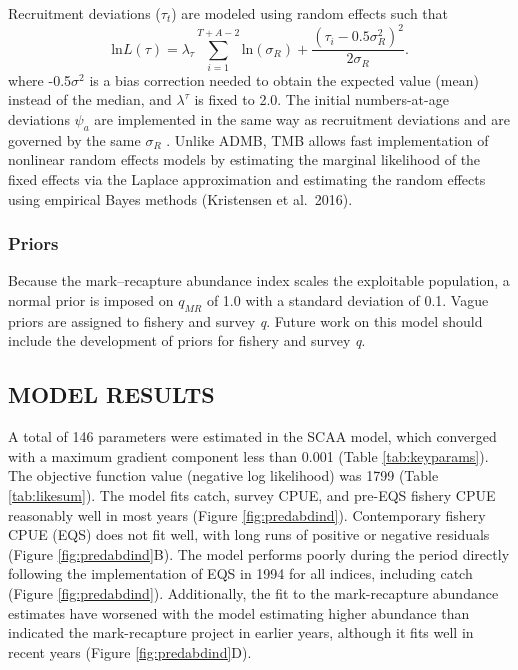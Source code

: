 \documentclass[
]{article}
\begin{document}
Recruitment deviations (\(\tau_t\)) are modeled using random effects such that
\[
\begin{equation}
\mbox{ln}L(\tau)=\lambda_{\tau}\sum_{i=1}^{T+A-2}\mbox{ln}(\sigma_R)+\frac{(\tau_i-0.5\sigma_R^2)^2}{2\sigma_R}.
\label{eq:randomrec}
\end{equation} 
\]
where -0.5\(\sigma^2\) is a bias correction needed to obtain the expected value (mean) instead of the median, and \(\lambda^{\tau}\) is fixed to 2.0. The initial numbers-at-age deviations \(\psi_a\) are implemented in the same way as recruitment deviations and are governed by the same \(\sigma_R\) . Unlike ADMB, TMB allows fast implementation of nonlinear random effects models by estimating the marginal likelihood of the fixed effects via the Laplace approximation and estimating the random effects using empirical Bayes methods (Kristensen et al.~2016).

\hypertarget{priors}{%
\subsubsection{Priors}\label{priors}}

Because the mark--recapture abundance index scales the exploitable population, a normal prior is imposed on \(q_{MR}\) of 1.0 with a standard deviation of 0.1. Vague priors are assigned to fishery and survey \emph{q}. Future work on this model should include the development of priors for fishery and survey \emph{q}.

\hypertarget{model-results}{%
\subsection{MODEL RESULTS}\label{model-results}}

A total of 146 parameters were estimated in the SCAA model, which converged with a maximum gradient component less than 0.001 (Table \ref{tab:keyparams}). The objective function value (negative log likelihood) was 1799 (Table \ref{tab:likesum}). The model fits catch, survey CPUE, and pre-EQS fishery CPUE reasonably well in most years (Figure \ref{fig:predabdind}). Contemporary fishery CPUE (EQS) does not fit well, with long runs of positive or negative residuals (Figure \ref{fig:predabdind}B). The model performs poorly during the period directly following the implementation of EQS in 1994 for all indices, including catch (Figure \ref{fig:predabdind}). Additionally, the fit to the mark-recapture abundance estimates have worsened with the model estimating higher abundance than indicated the mark-recapture project in earlier years, although it fits well in recent years (Figure \ref{fig:predabdind}D).
\end{document}

